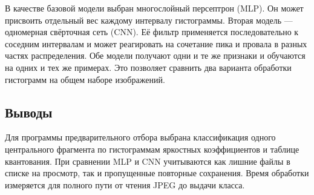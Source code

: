 В качестве базовой модели выбран многослойный персептрон (MLP). Он может присвоить отдельный вес каждому интервалу гистограммы. Вторая модель --- одномерная свёрточная сеть (CNN). Её фильтр применяется последовательно к соседним интервалам и может реагировать на сочетание пика и провала в разных частях распределения. Обе модели получают одни и те же признаки и обучаются на одних и тех же примерах. Это позволяет сравнить два варианта обработки гистограмм на общем наборе изображений.

\subsection*{Выводы}
Для программы предварительного отбора выбрана классификация одного центрального фрагмента по гистограммам яркостных коэффициентов и таблице квантования. При сравнении MLP и CNN учитываются как лишние файлы в списке на просмотр, так и пропущенные повторные сохранения. Время обработки измеряется для полного пути от чтения JPEG до выдачи класса.
